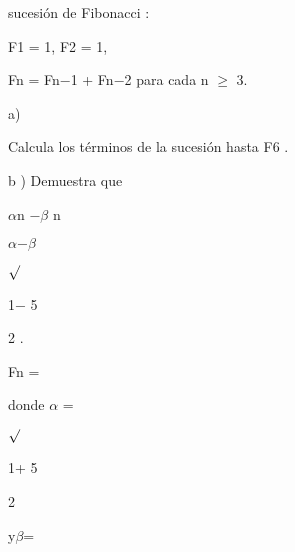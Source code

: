 \documentclass[a4paper,portrait,12pt]{article}
\begin{document}
\begin{flushleft}
sucesi\'{o}n de Fibonacci :
\end{flushleft}





\begin{flushleft}
F1 = 1, F2 = 1,
\end{flushleft}


\begin{flushleft}
Fn = Fn$-$1 + Fn$-$2 para cada n $\geq$ 3.
\end{flushleft}


\begin{flushleft}
a)
\end{flushleft}





\begin{flushleft}
Calcula los t\'{e}rminos de la sucesi\'{o}n hasta F6 .
\end{flushleft}


\begin{flushleft}
b ) Demuestra que
\end{flushleft}


\begin{flushleft}
$\alpha$n $-$$\beta$ n
\end{flushleft}


\begin{flushleft}
$\alpha$$-$$\beta$
\end{flushleft}


$\surd$


1$-$ 5


2 .





\begin{flushleft}
Fn =
\end{flushleft}





\begin{flushleft}
donde $\alpha$ =
\end{flushleft}





$\surd$


1+ 5


2





\begin{flushleft}
y$\beta$=
\end{flushleft}
\end{document}

